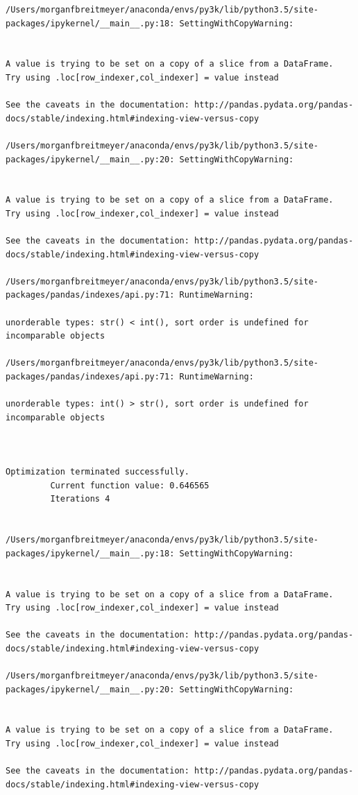 \begin{lstlisting}
/Users/morganfbreitmeyer/anaconda/envs/py3k/lib/python3.5/site-packages/ipykernel/__main__.py:18: SettingWithCopyWarning:


A value is trying to be set on a copy of a slice from a DataFrame.
Try using .loc[row_indexer,col_indexer] = value instead

See the caveats in the documentation: http://pandas.pydata.org/pandas-docs/stable/indexing.html#indexing-view-versus-copy

/Users/morganfbreitmeyer/anaconda/envs/py3k/lib/python3.5/site-packages/ipykernel/__main__.py:20: SettingWithCopyWarning:


A value is trying to be set on a copy of a slice from a DataFrame.
Try using .loc[row_indexer,col_indexer] = value instead

See the caveats in the documentation: http://pandas.pydata.org/pandas-docs/stable/indexing.html#indexing-view-versus-copy

/Users/morganfbreitmeyer/anaconda/envs/py3k/lib/python3.5/site-packages/pandas/indexes/api.py:71: RuntimeWarning:

unorderable types: str() < int(), sort order is undefined for incomparable objects

/Users/morganfbreitmeyer/anaconda/envs/py3k/lib/python3.5/site-packages/pandas/indexes/api.py:71: RuntimeWarning:

unorderable types: int() > str(), sort order is undefined for incomparable objects



Optimization terminated successfully.
         Current function value: 0.646565
         Iterations 4


/Users/morganfbreitmeyer/anaconda/envs/py3k/lib/python3.5/site-packages/ipykernel/__main__.py:18: SettingWithCopyWarning:


A value is trying to be set on a copy of a slice from a DataFrame.
Try using .loc[row_indexer,col_indexer] = value instead

See the caveats in the documentation: http://pandas.pydata.org/pandas-docs/stable/indexing.html#indexing-view-versus-copy

/Users/morganfbreitmeyer/anaconda/envs/py3k/lib/python3.5/site-packages/ipykernel/__main__.py:20: SettingWithCopyWarning:


A value is trying to be set on a copy of a slice from a DataFrame.
Try using .loc[row_indexer,col_indexer] = value instead

See the caveats in the documentation: http://pandas.pydata.org/pandas-docs/stable/indexing.html#indexing-view-versus-copy


\end{lstlisting}
